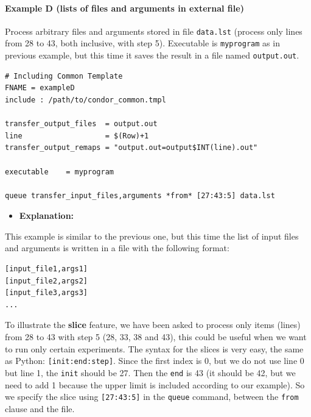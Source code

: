 \documentclass[a4paper,10pt]{article}
\begin{document}
\paragraph{Example D (lists of files and arguments in external file)}
\label{sec:org4b36e4f}

Process arbitrary files and arguments stored in file \texttt{data.lst} (process only
 lines from 28 to 43, both inclusive, with step 5). Executable is \texttt{myprogram} as
 in previous example, but this time it saves the result in a file named
 \texttt{output.out}. 

\begin{verbatim}
# Including Common Template
FNAME = exampleD
include : /path/to/condor_common.tmpl

transfer_output_files  = output.out
line                   = $(Row)+1
transfer_output_remaps = "output.out=output$INT(line).out"

executable    = myprogram

queue transfer_input_files,arguments *from* [27:43:5] data.lst
\end{verbatim}

\begin{itemize}
\item \textbf{Explanation:}
\end{itemize}

This example is similar to the previous one, but this time the list of input
files and arguments is written in a file with the following format:

\begin{verbatim}
[input_file1,args1]
[input_file2,args2]
[input_file3,args3]
...
\end{verbatim}

To illustrate the \textbf{slice} feature, we have been asked to process only items
(lines) from 28 to 43 with step 5 (28, 33, 38 and 43), this could be useful when
we want to run only certain experiments. The syntax for the slices is very easy,
the same as Python: \texttt{[init:end:step]}. Since the first index is 0, but we do not
use line 0 but line 1, the \texttt{init} should be 27. Then the \texttt{end} is 43 (it should
be 42, but we need to add 1 because the upper limit is included according to our
example). So we specify the slice using \texttt{[27:43:5]} in the \texttt{queue} command,
between the \texttt{from} clause and the file.
\end{document}
